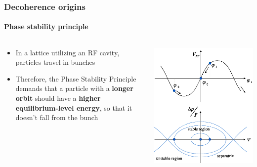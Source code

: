 \documentclass{beamer}
\begin{document}
\begin{frame}\frametitle{Decoherence origins} \framesubtitle{Phase stability principle}
  \begin{columns}
    \begin{column}{.5\textwidth}
      \begin{itemize}
      \item In a lattice utilizing an RF cavity, particles travel in bunches
      \item Therefore, the Phase Stability Principle demands that a particle with a \textbf{longer orbit} should have a \textbf{higher equilibrium-level energy}, so that it doesn't fall from the bunch
      \end{itemize}
    \end{column}
    \begin{column}{.5\textwidth}
      \centering
      \includegraphics[width=\linewidth]{psp_diagram}
    \end{column}
  \end{columns}
\end{frame}
\end{document}
